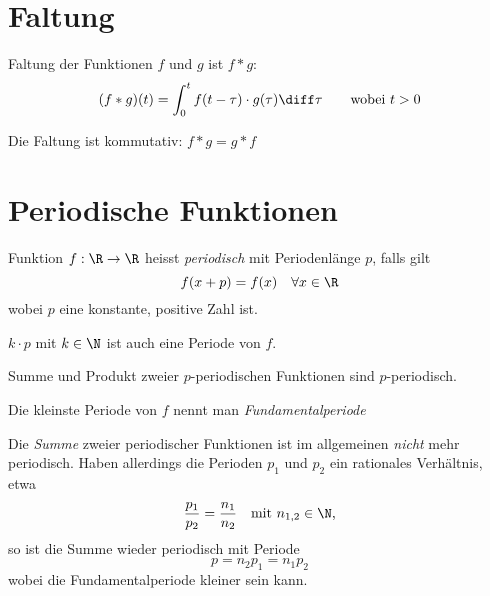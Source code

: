 
\section{Faltung} %
	\begin{definition}
		Faltung der Funktionen $f$ und $g$ ist $f*g$: \[
			(f*g)(t) = \int_0^t f(t-\tau) \cdot g(\tau) \diff \tau \qquad \text{wobei } t > 0
		\]
		
		Die Faltung ist kommutativ: $f*g=g*f$
	\end{definition}

\section{Periodische Funktionen} %
		\begin{definition}
		Funktion $f:\R\to\R$ heisst \emph{periodisch} mit Periodenlänge $p$, falls gilt\[
			f(x+p) = f(x) \quad \forall x \in \R
		\] wobei $p$ eine konstante, positive Zahl ist.
	\end{definition}

	\begin{bemerkungen}
		\item $k\cdot p$ mit $k \in \N$ ist auch eine Periode von $f$.
		\item Summe und Produkt zweier $p$-periodischen Funktionen sind $p$-periodisch.
	\end{bemerkungen}

	\begin{definition}
		Die kleinste Periode von $f$ nennt man \emph{Fundamentalperiode}
	\end{definition}
	
	\begin{regeln}
		\begin{tightitemize}
			\item Die \emph{Summe} zweier periodischer Funktionen ist im allgemeinen
			\emph{nicht} mehr periodisch. Haben allerdings die Perioden $p_1$ und $p_2$ ein
			rationales Verhältnis, etwa \[
				\frac{p_1}{p_2}=\frac{n_1}{n_2} \quad \text{mit $n_{1,2} \in \N$,}
			\] so ist die Summe wieder periodisch mit Periode \[
				p = n_2 p_1 = n_1 p_2
			\] wobei die Fundamentalperiode kleiner sein kann.
		\end{tightitemize}
	\end{regeln}

